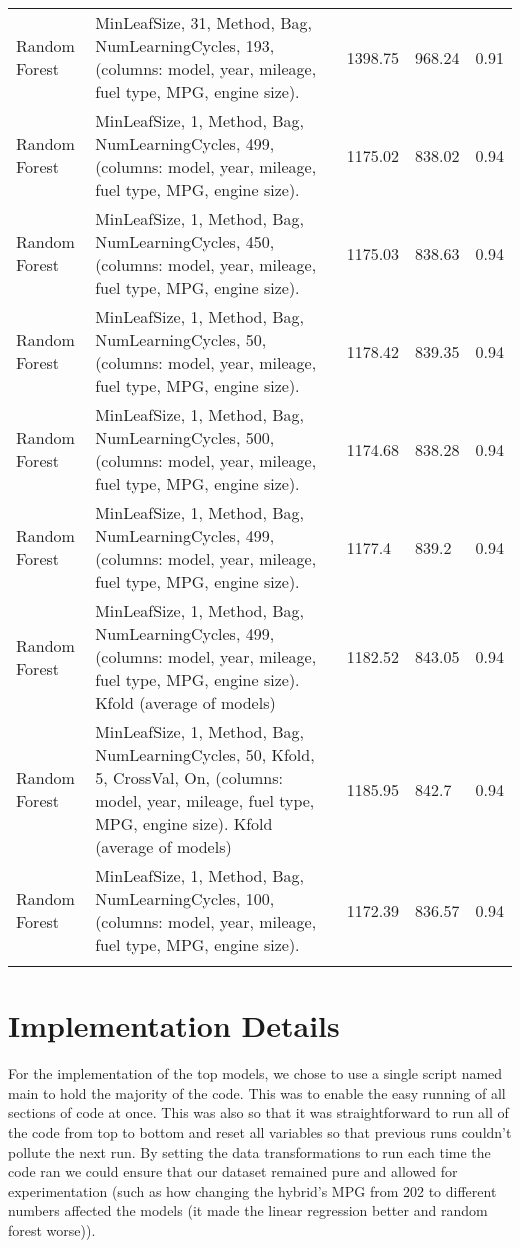\documentclass[a4pape, 11pt, english]{article}
\begin{document}
\begin{longtable}{m{3.4cm}m{6.6cm}m{1.5cm}m{1.5cm}m{1.5cm}}
\addlinespace
\hline
Random Forest & MinLeafSize, 31, Method, Bag, NumLearningCycles, 193, (columns: model, year, mileage, fuel type, MPG, engine size). & 1398.75 & 968.24 & 0.91 \\
\addlinespace
\hline
Random Forest & MinLeafSize, 1, Method, Bag, NumLearningCycles, 499, (columns: model, year, mileage, fuel type, MPG, engine size). & 1175.02 & 838.02 & 0.94 \\
\addlinespace
\hline
Random Forest & MinLeafSize, 1, Method, Bag, NumLearningCycles, 450, (columns: model, year, mileage, fuel type, MPG, engine size). & 1175.03 & 838.63 & 0.94 \\
\addlinespace
\hline
Random Forest & MinLeafSize, 1, Method, Bag, NumLearningCycles, 50, (columns: model, year, mileage, fuel type, MPG, engine size). & 1178.42 & 839.35 & 0.94 \\
\addlinespace
\hline
Random Forest & MinLeafSize, 1, Method, Bag, NumLearningCycles, 500, (columns: model, year, mileage, fuel type, MPG, engine size). & 1174.68 & 838.28 & 0.94 \\
\addlinespace
\hline
Random Forest & MinLeafSize, 1, Method, Bag, NumLearningCycles, 499, (columns: model, year, mileage, fuel type, MPG, engine size). & 1177.4 & 839.2 & 0.94 \\
\addlinespace
\hline
Random Forest & MinLeafSize, 1, Method, Bag, NumLearningCycles, 499, (columns: model, year, mileage, fuel type, MPG, engine size). Kfold (average of models) & 1182.52 & 843.05 & 0.94 \\
\addlinespace
\hline
Random Forest & MinLeafSize, 1, Method, Bag, NumLearningCycles, 50, Kfold, 5, CrossVal, On, (columns: model, year, mileage, fuel type, MPG, engine size). Kfold (average of models) & 1185.95 & 842.7 & 0.94 \\
\addlinespace
\hline
Random Forest & MinLeafSize, 1, Method, Bag, NumLearningCycles, 100, (columns: model, year, mileage, fuel type, MPG, engine size). & 1172.39 & 836.57 & 0.94 \\
\addlinespace
\hline
\end{longtable}

\section{Implementation Details}
For the implementation of the top models, we chose to use a single script named main to hold the majority of the code. This was to enable the easy running of all sections of code at once. This was also so that it was straightforward to run all of the code from top to bottom and reset all variables so that previous runs couldn't pollute the next run. By setting the data transformations to run each time the code ran we could ensure that our dataset remained pure and allowed for experimentation (such as how changing the hybrid's MPG from 202 to different numbers affected the models (it made the linear regression better and random forest worse)).
\end{document}
